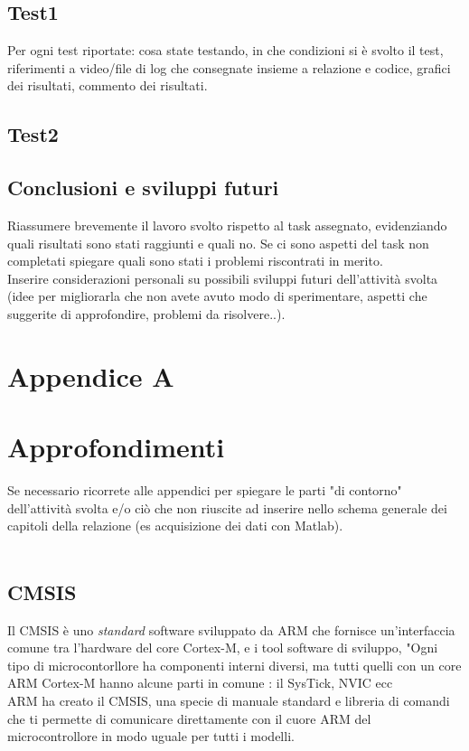 \documentclass[11pt]{report}
\begin{document}
\section{Test1}
Per ogni test riportate: cosa state testando, in che condizioni si è svolto il test, riferimenti a video/file di log che consegnate insieme a relazione e codice, grafici dei risultati, commento dei risultati.

\section{Test2}

\newpage
{}
\section*{Conclusioni e sviluppi futuri}
Riassumere brevemente il lavoro svolto rispetto al task assegnato, evidenziando quali risultati sono stati raggiunti e quali no. Se ci sono aspetti del task non completati spiegare quali sono stati i problemi riscontrati in merito.\\
Inserire considerazioni personali su possibili sviluppi futuri dell'attività svolta (idee per migliorarla che non avete avuto modo di sperimentare, aspetti che suggerite di approfondire, problemi da risolvere..).

\appendix
\chapter{Appendice A\\\\Approfondimenti}


Se necessario ricorrete alle appendici per spiegare le parti "di contorno" dell'attività svolta e/o ciò che non riuscite ad inserire nello schema generale dei capitoli della relazione (es acquisizione dei dati con Matlab).
\\\\
\section{CMSIS}
Il CMSIS è uno \textit{standard} software sviluppato da ARM che
fornisce un'interfaccia comune tra l'hardware del core Cortex-M, e i tool software di sviluppo, "Ogni tipo di microcontorllore ha componenti interni 
diversi, ma tutti quelli con un core ARM Cortex-M hanno alcune parti in comune : il SysTick, NVIC ecc\\
ARM ha creato il CMSIS, una specie di manuale standard e libreria di comandi che ti permette di comunicare direttamente con il cuore ARM del microcontrollore in modo uguale per tutti i modelli.
\end{document}
